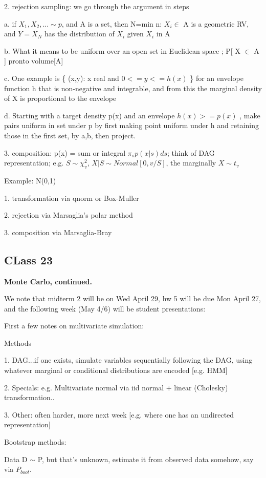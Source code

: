 \documentclass[11pt,a4paper]{article}
\begin{document}
	2. rejection sampling:  we go through the argument in steps
	
	a.  if $X_1, X_2,... \sim p$, and A is a set, then N=min{ n: $X_i \in$ A} is a geometric RV, and $ Y = X_N $ has the distribution of $ X_i$ given $ X_i$ in A
	
	b.    What it means to be uniform over an open set in Euclidean space ; P[ X $\in$ A ] pronto volume[A]
	
	c.   One example is \{ (x,y):  x real and $0 <= y <= h(x)$ \} for an envelope function h that is non-negative and integrable, and from this the marginal density of X is proportional to the envelope
	
	d.  Starting with a target density p(x) and an envelope $h(x) >= p(x)$ , make pairs uniform in set under p by first making point uniform under h and retaining those in the first set, by a,b, then project.
	
	3. composition: p(x) = sum or integral $\pi_s  p(x|s)   ds$;     think of DAG representation; e.g. $S \sim \chi^2_v$,  $ X|S \sim Normal[ 0, v/S ]$, the marginally $X \sim t_v$
	
	Example: N(0,1)
	
	1. transformation via qnorm or Box-Muller
	
	2. rejection via Marsaglia's polar method
	
	3. composition via Marsaglia-Bray  

\subsection*{CLass 23}	
\textbf{Monte Carlo, continued.}
	
	We note that midterm 2 will be on Wed April 29, hw 5 will be due Mon April 27, and the following week (May 4/6) will be student presentations:
	
	First a few notes on multivariate simulation:
	
	Methods 
	
	1.  DAG...if one exists, simulate variables sequentially following the DAG, using whatever marginal or conditional distributions are encoded [e.g. HMM]
	
	2. Specials:  e.g. Multivariate normal via iid normal + linear (Cholesky) transformation..
	
	3. Other: often harder, more next week [e.g. where one has an undirected representation]
	
	Bootstrap methods:
	
	Data D $\sim$ P, but that's unknown, estimate it from observed data somehow, say via $P_{boot}$.
	
\end{document}
